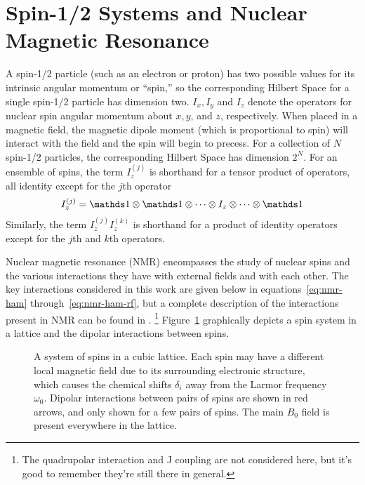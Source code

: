 \section{Spin-1/2 Systems and Nuclear Magnetic Resonance}

A spin-1/2 particle (such as an electron or proton) has two possible values for its intrinsic angular momentum or ``spin,'' so the corresponding Hilbert Space for a single spin-1/2 particle has dimension two. $I_x, I_y$ and $I_z$ denote the operators for nuclear spin angular momentum about $x, y$, and $z$, respectively. When placed in a magnetic field, the magnetic dipole moment (which is proportional to spin) will interact with the field and the spin will begin to precess.
For a collection of $N$ spin-1/2 particles, the corresponding Hilbert Space has dimension $2^N$.
For an ensemble of spins, the term $I_z^{(j)}$ is shorthand for a tensor product of operators, all identity except for the $j$th operator
\begin{equation}
    I_z^{(j)} = \identity \otimes \identity \otimes \dots \otimes I_z \otimes \dots \otimes \identity
\end{equation}
Similarly, the term $I_z^{(j)}I_z^{(k)}$ is shorthand for a product of identity operators except for the $j$th and $k$th operators.

Nuclear magnetic resonance (NMR) encompasses the study of nuclear spins and the various interactions they have with external fields and with each other.
The key interactions considered in this work are given below in equations~\ref{eq:nmr-ham} through~\ref{eq:nmr-ham-rf}, but a complete description of the interactions present in NMR can be found in \cite{1976ii}.%
\footnote{The quadrupolar interaction and J coupling are not considered here, but it's good to remember they're still there in general.}
Figure~\ref{fig:spin-system} graphically depicts a spin system in a lattice and the dipolar interactions between spins.

\begin{figure}[H]
    \centering
    
    \caption{A system of spins in a cubic lattice. Each spin may have a different local magnetic field due to its surrounding electronic structure, which causes the chemical shifts $\delta_i$ away from the Larmor frequency $\omega_0$. Dipolar interactions between pairs of spins are shown in red arrows, and only shown for a few pairs of spins. The main $B_0$ field is present everywhere in the lattice.}
    \label{fig:spin-system}
\end{figure}

